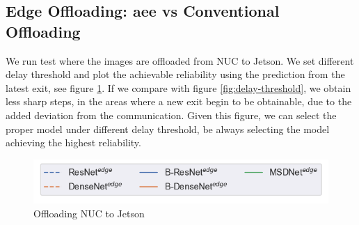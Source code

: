 \subsection{Edge Offloading: \gls{aee} vs Conventional Offloading}

We run test where the images are offloaded from NUC to Jetson. We set different delay threshold and plot the achievable reliability using the prediction from the latest exit, see figure \ref{fig:practical-offloading}. If we compare with figure \ref{fig:delay-threshold}, we obtain less sharp steps, in the areas where a new exit begin to be obtainable, due to the added deviation from the communication. Given this figure, we can select the proper model under different delay threshold, be always selecting the model achieving the highest reliability.  

\begin{figure}
	\captionsetup[subfigure]{justification=centering,farskip=1pt,captionskip=1pt}
	\centering
	\includegraphics[width=.5\linewidth]{figures/edge/offloading_legend}
	\hfill
	\caption[Offloading NUC to Jetson]{Offloading NUC to Jetson}
	\label{fig:practical-offloading}
\end{figure}

